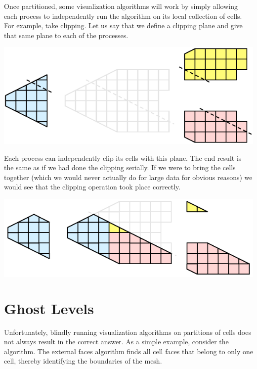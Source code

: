 Once partitioned, some visualization algorithms will work by simply
allowing each process to independently run the algorithm on its local
collection of cells.  For example, take clipping.  Let us say that we
define a clipping plane and give that same plane to each of the processes.

\begin{inlinefig}
  \includegraphics{images/ParallelExampleClip1}
\end{inlinefig}

Each process can independently clip its cells with this plane.  The end
result is the same as if we had done the clipping serially.  If we were to
bring the cells together (which we would never actually do for large data
for obvious reasons) we would see that the clipping operation took place
correctly.

\begin{inlinefig}
  \includegraphics{images/ParallelExampleClip2}
\end{inlinefig}


\section{Ghost Levels}

Unfortunately, blindly running visualization algorithms on partitions of
cells does not always result in the correct answer.  As a simple example,
consider the  algorithm.  The external faces
algorithm finds all cell faces that belong to only one cell, thereby
identifying the boundaries of the mesh.

